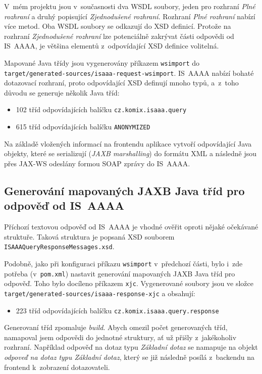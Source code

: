 \documentclass[thesis=M,czech]{FITthesis}[2019/12/23]
\begin{document}
V~mém projektu jsou v~současnosti dva WSDL soubory, jeden pro rozhraní \textit{Plné rozhraní} a druhý popisující \textit{Zjednodušené rozhraní}. Rozhraní \textit{Plné rozhraní} nabízí více metod. Oba WSDL soubory se odkazují do XSD definicí. Protože na rozhraní \textit{Zjednodušené rozhraní} lze potenciálně zakrývat části odpovědi od IS~AAAA, je většina elementů z~odpovídající XSD definice volitelná.

Mapované Java třídy jsou vygenerovány příkazem \texttt{wsimport} do\\ \texttt{target/generated-sources/isaaa-request-wsimport}.
IS~AAAA nabízí bohaté dotazovací rozhraní, proto odpovídající XSD definují mnoho typů, a~z~toho důvodu se generuje několik Java tříd:
\begin{itemize}
	\item 102 tříd odpovídajících balíčku \texttt{cz.komix.isaaa.query}
	\item 615 tříd odpovídajících balíčku \texttt{ANONYMIZED}
\end{itemize}

Na základě vložených informací na frontendu aplikace vytvoří odpovídající Java objekty, které se serializují (\textit{JAXB marshalling}) do formátu XML  a následně jsou přes JAX-WS odeslány formou SOAP zprávy do IS~AAAA.

\subsection{Generování mapovaných JAXB Java tříd pro odpověď od IS~AAAA}
Příchozí textovou odpověď od IS~AAAA je vhodné ověřit oproti nějaké očekávané struktuře. Taková struktura je popsaná XSD souborem \\ \texttt{ISAAAQueryResponseMessages.xsd}. 

Podobně, jako při konfiguraci příkazu \texttt{wsimport} v~předchozí části, bylo i~zde potřeba (v~\texttt{pom.xml}) nastavit generování mapovaných JAXB Java tříd pro odpověď. \cite{JAXB}
Toho bylo docíleno příkazem \texttt{xjc}. Vygenerované soubory jsou ve složce\\ \texttt{target/generated-sources/isaaa-response-xjc} a obsahují:
\begin{itemize}
	\item 223 tříd odpovídajících balíčku \texttt{cz.komix.isaaa.query.response}
\end{itemize}

Generovaní tříd zpomaluje \textit{build}. Abych omezil počet generovaných tříd, namapoval jsem odpovědi do jednotné struktury, ať už přišly z~jakékoholiv rozhraní. Například odpověď na dotaz typu \textit{Základní dotaz} se namapuje na objekt \textit{odpoveď na dotaz typu Základní dotaz}, který se již následně posílá z~backendu na frontend k~zobrazení dotazovateli.
\end{document}
